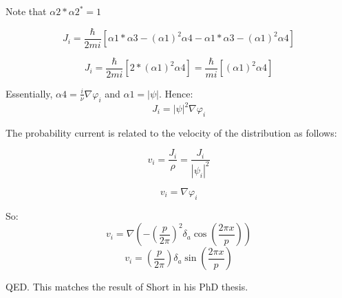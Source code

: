 Note that $\alpha 2 * \alpha 2^* = 1$

\begin{equation}
J_i = \frac{\hbar}{2mi} [\alpha 1 * \alpha 3 - (\alpha 1)^2 \alpha 4 -\alpha 1 * \alpha 3 - (\alpha 1)^2 \alpha 4]
\end{equation}

\begin{equation}
J_i = \frac{\hbar}{2mi} [ 2* (\alpha 1)^2 \alpha 4] = \frac{\hbar}{mi} [(\alpha 1)^2 \alpha 4]
\end{equation}

Essentially, $\alpha 4 = \frac{i}{\nu} \nabla \varphi_i$ and $\alpha 1 = |\psi|$. Hence:
\begin{equation}
J_i = |\psi|^2 \nabla \varphi_i
\end{equation}

The probability current is related to the velocity of the distribution as follows:

\begin{equation}
v_i = \frac{J_i}{\rho} = \frac{J_i}{|\psi_i|^2}
\end{equation}

\begin{equation}
v_i = \nabla \varphi_i
\end{equation}

So:
\begin{equation}
v_i = \nabla \left(-\left(\frac{p}{2\pi}\right)^2 \delta_a \cos\left(\frac{2\pi x}{p}\right)\right)
\end{equation}
\begin{equation}
v_i = \left(\frac{p}{2\pi}\right)\delta_a \sin\left(\frac{2\pi x}{p}\right)
\end{equation}

QED. This matches the result of Short in his PhD thesis.
